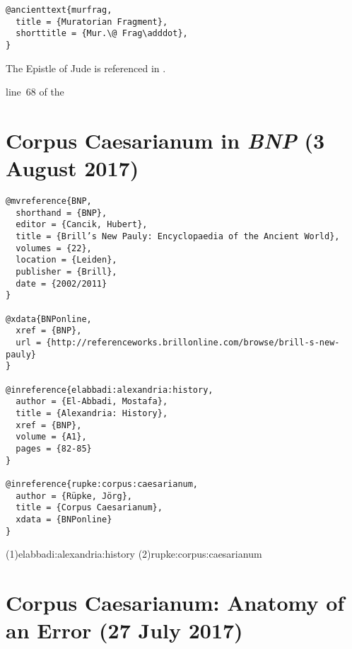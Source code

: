 \documentclass[a4paper]{article}
\begin{document}
\begin{verbatim}
@ancienttext{murfrag,
  title = {Muratorian Fragment},
  shorttitle = {Mur.\@ Frag\adddot},
}
\end{verbatim}

\begin{verbcite}
  The Epistle of Jude is referenced in \cite[(68)]{murfrag}.
\end{verbcite}
\begin{verbcite}
  \parencite[(\lineno~68)]{murfrag}
\end{verbcite}
\begin{verbcite}
  line~68 of the 
\end{verbcite}
\exampleancientsources
{}

\section{Corpus Caesarianum in \emph{BNP} (3 August 2017)}

\begin{verbatim}
@mvreference{BNP,
  shorthand = {BNP},
  editor = {Cancik, Hubert},
  title = {Brill’s New Pauly: Encyclopaedia of the Ancient World},
  volumes = {22},
  location = {Leiden},
  publisher = {Brill},
  date = {2002/2011}
}

@xdata{BNPonline,
  xref = {BNP},
  url = {http://referenceworks.brillonline.com/browse/brill-s-new-pauly}
}

@inreference{elabbadi:alexandria:history,
  author = {El-Abbadi, Mostafa},
  title = {Alexandria: History},
  xref = {BNP},
  volume = {A1},
  pages = {82-85}
}

@inreference{rupke:corpus:caesarianum,
  author = {Rüpke, Jörg},
  title = {Corpus Caesarianum},
  xdata = {BNPonline}
}
\end{verbatim}

\examplecite(1){elabbadi:alexandria:history}
\examplecite(2){rupke:corpus:caesarianum}
\exampleabbreviations
\examplebibliography
{}

\section{Corpus Caesarianum: Anatomy of an Error (27 July 2017)}
\end{document}

